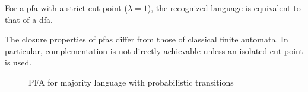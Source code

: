 \begin{corollary}
For a \gls{pfa} with a strict cut-point (\(\lambda = 1\)), the recognized language is equivalent to that of a \gls{dfa}.
\end{corollary}

\begin{observation}
The closure properties of \glspl{pfa} differ from those of classical finite automata. In particular, complementation is not directly achievable unless an isolated cut-point is used.
\end{observation}
\begin{figure}[h]
    \centering  
    \caption{PFA for majority language with probabilistic transitions}
    \label{fig:pfa-example}
\end{figure}

